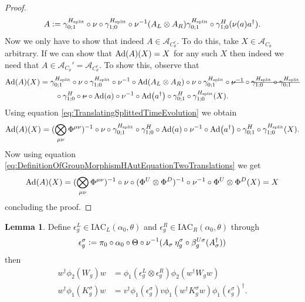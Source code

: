 \documentclass[12pt,a4paper,twoside]{article}
\newcommand{\stkout}[1]{\ifmmode\text{\sout{\ensuremath{#1}}}\else\sout{#1}\fi}
\newcommand{\IAC}{\textrm{IAC}}
\newcommand{\defeq}{\vcentcolon=}
\let\originalleft\left
\let\originalright\right
\renewcommand{\left}{\mathopen{}\mathclose\bgroup\originalleft}
\renewcommand{\right}{\aftergroup\egroup\originalright}
\renewcommand{\AA}{\mathcal A}
\newcommand{\Ad}[1]{\textrm{Ad}\left(#1\right)}
\theoremstyle{definition}
\newtheorem{lemma}[theorem]{Lemma}
\numberwithin{equation}{section}
\begin{document}
\begin{proof}
\begin{equation}
		A\defeq \gamma^{H_\text{split}}_{0;1}\circ\nu\circ\gamma^{H_\text{split}}_{1;0}\circ\nu^{-1}(A_L\otimes A_R)\gamma^{H_\text{split}}_{0;1}\circ\gamma^H_{1;0}(\nu(a)a^\dagger).
	\end{equation}
	Now we only have to show that indeed $A\in\AA_{C_\theta^c}$. To do this, take $X\in\AA_{C_\theta}$ arbitrary. If we can show that $\Ad{A}(X)=X$ for any such $X$ then indeed we need that $A\in\AA_{C_\theta}'=\AA_{C_\theta^c}$. To show this, observe that
	\begin{align}
		\Ad{A}(X)&=\gamma^{H_\text{split}}_{0;1}\circ\nu\circ\gamma^{H_\text{split}}_{1;0}\circ\nu^{-1}\circ\Ad{A_L\otimes A_R}\circ\nu\circ\gamma^{H_\text{split}}_{0;1}\circ\stkout{\nu^{-1}}\circ\stkout{\gamma^{H_\text{split}}_{1;0}\circ\gamma^{H_\text{split}}_{0;1}}\\
		&\nonumber
		\qquad\circ\gamma^H_{1;0}\circ\stkout{\nu}\circ\Ad{a}\circ\nu^{-1}\circ\Ad{a^\dagger}\circ\gamma^H_{0;1}\circ\gamma^{H_\text{split}}_{1;0}(X).
	\end{align}
	Using equation \eqref{eq:TranslatingSplittedTimeEvolution} we obtain
	\begin{equation}
		\Ad{A}(X)=(\bigotimes_{\mu\nu}\Phi^{\mu\nu})^{-1}\circ\nu\circ\gamma^{H_\text{split}}_{0;1}\circ\gamma^H_{1;0}\circ\Ad{a}\circ\nu^{-1}\circ\Ad{a^\dagger}\circ\gamma^H_{0;1}\circ\gamma^{H_\text{split}}_{1;0}(X).
	\end{equation}
	Now using equation \eqref{eq:DefinitionOfGroupMorphismHAutEquationTwoTranslations} we get
	\begin{equation}
		\Ad{A}(X)=(\bigotimes_{\mu\nu}\Phi^{\mu\nu})^{-1}\circ\nu\circ(\Phi^U\otimes\Phi^D)^{-1}\circ\nu^{-1}\circ\Phi^U\otimes\Phi^D(X)=X
	\end{equation}
	concluding the proof.
\end{proof}
\begin{lemma}
	Define $\epsilon^L_g\in\IAC_L(\alpha_0,\theta)$ and $\epsilon^R_g\in\IAC_R(\alpha_0,\theta)$ through
	\begin{align}
		\epsilon_g^\sigma\defeq \pi_0\circ\alpha_0\circ\Theta\circ\nu^{-1}(A_\sigma\:\eta_g^\sigma\circ\beta_{g}^{U\sigma}(A_\sigma^\dagger))
	\end{align}
	then
	\begin{align}
		w^\dagger \phi_2(W_g)w &= \phi_1(\epsilon_g^L\otimes\epsilon_g^R)\phi_2(w^\dagger W_g w)\\
		\label{eq:TransformationOfKUnderEpsilon}
		w^\dagger \phi_1(K_g^\sigma)w&=v^\dagger\phi_1(\epsilon_g^\sigma)v\phi_1(w^\dagger K_g^\sigma w)\phi_1(\epsilon_g^\sigma)^\dagger.
	\end{align}
\end{lemma}
\end{document}

